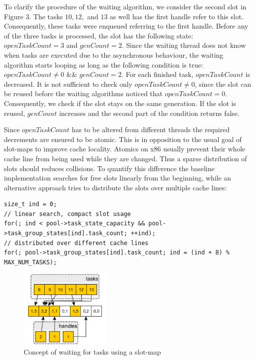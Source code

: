 \documentclass[conference]{IEEEtran}
\begin{document}
To clarify the procedure of the waiting algorithm, we consider the second slot in Figure 3. The tasks $10, 12, $ and $13$ as well has the first handle refer to this slot. Consequently, these tasks were enqueued referring to the first handle. Before any of the three tasks is processed, the slot has the following state: $openTaskCount = 3$ and $genCount =  2$. Since the waiting thread does not know when tasks are executed due to the asynchronous behaviour, the waiting algorithm starts looping as long as the following condition is true: $openTaskCount \neq 0$ \&\& $genCount = 2$. For each finished task, $openTaskCount$ is decreased. It is not sufficient to check only $openTaskCount \neq 0$, since the slot can be reused before the waiting algorithms noticed that $openTaskCount = 0$. Consequently, we check if the slot stays on the same generation. If the slot is reused, $genCount$ increases and the second part of the condition returns false.

Since $openTaskCount$ has to be altered from different threads the required decrements are ensured to be atomic. This is in opposition to the usual goal of slot-maps to improve cache locality. Atomics on x86 usually prevent their whole cache line from being used while they are changed. Thus a sparse distribution of slots should reduces collisions. To quantify this difference the baseline implementation searches for free slots linearly from the beginning, while an alternative approach tries to distribute the slots over multiple cache lines:
\begin{lstlisting}[style=CStyle]
size_t ind = 0;
// linear search, compact slot usage
for(; ind < pool->task_state_capacity && pool->task_group_states[ind].task_count; ++ind);
// distributed over different cache lines
for(; pool->task_group_states[ind].task_count; ind = (ind + 8) % MAX_NUM_TASKS);
\end{lstlisting}

\begin{figure}
	\includegraphics[width=0.4\textwidth]{img/waitingconcept.png}
	\caption{Concept of waiting for tasks using a slot-map}
	\label{fig2}
\end{figure}
\end{document}
